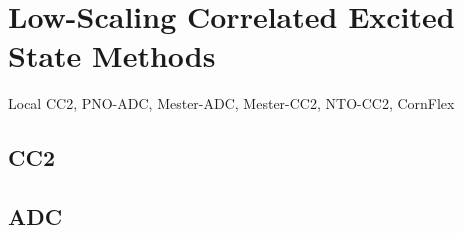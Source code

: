 


\section{Low-Scaling Correlated Excited State Methods}
Local CC2, PNO-ADC, Mester-ADC, Mester-CC2, NTO-CC2, CornFlex


\subsection{CC2}


\subsection{ADC}

